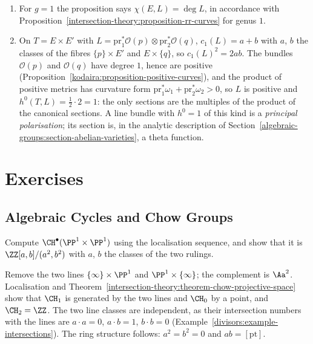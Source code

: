 \begin{example}\label{intersection-theory:example-rr-tori}
\begin{enumerate}
\item For $g = 1$ the proposition says $\chi(E, L) = \deg L$, in accordance with Proposition~\ref{intersection-theory:proposition-rr-curves} for genus $1$.
\item On $T = E \times E'$ with $L = \mathrm{pr}_1^*\mathcal{O}(p) \otimes \mathrm{pr}_2^*\mathcal{O}(q)$, $c_1(L) = a + b$ with $a$, $b$ the classes of the fibres $\{p\} \times E'$ and $E \times \{q\}$, so
$c_1(L)^2 = 2ab$. The bundles $\mathcal{O}(p)$ and $\mathcal{O}(q)$ have degree $1$, hence are positive (Proposition~\ref{kodaira:proposition-positive-curves}), and the product of positive metrics has curvature form
$\mathrm{pr}_1^*\omega_1 + \mathrm{pr}_2^*\omega_2 > 0$, so $L$ is positive and $h^0(T, L) = \frac12 \cdot 2 = 1$: the only sections are the multiples of the product of the canonical sections. A line bundle with $h^0 = 1$ of this kind is a \emph{principal polarisation}; its section is,
in the analytic description of Section~\ref{algebraic-groups:section-abelian-varieties}, a theta function.
\end{enumerate}
\end{example}

\section{Exercises}\label{intersection-theory:section-exercises}

\subsection{Algebraic Cycles and Chow Groups}\label{intersection-theory:subsection-exercises-algebraic-cycles-and-chow-groups}

\begin{exercise}\label{intersection-theory:exercise-chow-quadric}
Compute $\CH^\bullet(\PP^1 \times \PP^1)$ using the localisation sequence, and show that it is $\ZZ[a, b]/(a^2, b^2)$ with $a$, $b$ the classes of the two rulings.
\end{exercise}

\begin{solution}
Remove the two lines $\{\infty\} \times \PP^1$ and $\PP^1 \times \{\infty\}$; the complement is $\Aa^2$. Localisation and Theorem~\ref{intersection-theory:theorem-chow-projective-space}
show that $\CH_1$ is generated by the two lines and $\CH_0$ by a point, and $\CH_2 = \ZZ$. The two line classes are independent, as their intersection numbers with the lines are
$a \cdot a = 0$, $a \cdot b = 1$, $b \cdot b = 0$ (Example~\ref{divisors:example-intersections}). The ring structure follows: $a^2 = b^2 = 0$ and $ab = [\mathrm{pt}]$.
\end{solution}

